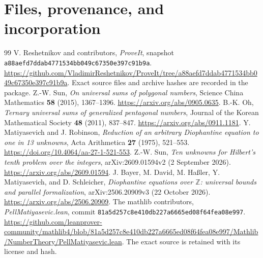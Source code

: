 \documentclass[11pt]{article}
\theoremstyle{remark}\newtheorem{remark}[theorem]{Remark}
\newcommand{\Z}{\mathbb Z}\newcommand{\N}{\mathbb N}\newcommand{\Q}{\mathbb Q}
\newcommand{\repo}{\nolinkurl{a88aefd7ddab4771534bb049c67350e397c91b9a}}
\begin{document}
\section{Files, provenance, and incorporation}

\begin{thebibliography}{99}
 V. Reshetnikov and contributors, \emph{ProveIt}, snapshot
\repo. \url{https://github.com/VladimirReshetnikov/ProveIt/tree/a88aefd7ddab4771534bb049c67350e397c91b9a}.
Exact source files and archive hashes are recorded in the package.
 Z.-W. Sun, \emph{On universal sums of polygonal numbers},
Science China Mathematics \textbf{58} (2015), 1367--1396.
\url{https://arxiv.org/abs/0905.0635}.
 B.-K. Oh, \emph{Ternary universal sums of generalized
pentagonal numbers}, Journal of the Korean Mathematical Society
\textbf{48} (2011), 837--847. \url{https://arxiv.org/abs/0911.1181}.
 Y. Matiyasevich and J. Robinson, \emph{Reduction of an
arbitrary Diophantine equation to one in 13 unknowns}, Acta Arithmetica
\textbf{27} (1975), 521--553. \url{https://doi.org/10.4064/aa-27-1-521-553}.
 Z.-W. Sun, \emph{Ten unknowns for Hilbert's tenth problem
over the integers}, arXiv:2609.01594v2 (2 September 2026).
\url{https://arxiv.org/abs/2609.01594}.
 J. Bayer, M. David, M. Ha\ss ler, Y. Matiyasevich, and
D. Schleicher, \emph{Diophantine equations over $\Z$: universal bounds
and parallel formalization}, arXiv:2506.20909v3 (22 October 2026).
\url{https://arxiv.org/abs/2506.20909}.
 The mathlib contributors, \emph{PellMatiyasevic.lean},
commit \nolinkurl{81a5d257c8e410db227a6665ed08f64fea08e997}.
\url{https://github.com/leanprover-community/mathlib4/blob/81a5d257c8e410db227a6665ed08f64fea08e997/Mathlib/NumberTheory/PellMatiyasevic.lean}.
The exact source is retained with its license and hash.
\end{thebibliography}
\end{document}

